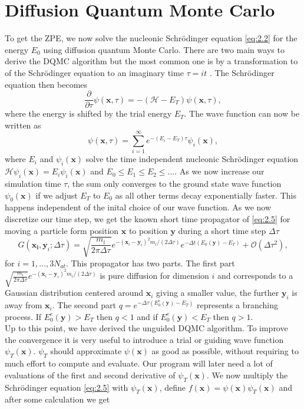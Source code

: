 \documentclass [12pt]{report}
\begin{document}
\section{Diffusion Quantum Monte Carlo}
To get the ZPE, we now solve the nucleonic Schrödinger equation \eqref{eq:2.2} for the energy $E_0$ using diffusion quantum Monte Carlo. There are two main ways to derive the DQMC algorithm but the most common one is by a transformation to of the Schrödinger equation to an imaginary time $\tau = it$ \cite{mccoy,cyrus,herleitung2}. The Schrödinger equation then becomes
\begin{equation} \label{eq:2.5}
\frac{\partial}{\partial \tau} \psi(\bm{x},\tau) = -(\mathcal{H} - E_T) \psi(\bm{x},\tau),
\end{equation}
where the energy is shifted by the trial energy $E_T$. The wave function can now be written as
\begin{equation} \label{eq:2.6}
\psi(\bm{x},\tau) = \sum_{i=1}^{\infty} e^{-(E_i - E_T)\tau}\psi_i(\bm{x}),
\end{equation}
where $E_i$ and $\psi_i(\bm{x})$ solve the time independent nucleonic Schrödinger equation $\mathcal{H}\psi_i(\bm{x}) = E_i \psi_i(\bm{x})$ and $E_0 \leq E_1 \leq E_2 \leq...$.
As we now increase our simulation time $\tau$, the sum only converges to the ground state wave function $\psi_0(\bm{x})$ if we adjust $E_T$ to $E_0$ as all other terms decay exponentially faster. This happens independent of the inital choice of our wave function.
As we now discretize our time step, we get the known short time propagator of \eqref{eq:2.5} for moving a particle form position $\bm{x}$ to position $\bm{y}$ during a short time step $\Delta \tau$
\begin{equation} \label{eq:2.7}
G(\bm{x_i},\bm{y}_i;\Delta \tau) = \sqrt{\frac{m_i}{2 \pi \Delta \tau}} e^{-(\bm{x}_i-\bm{y}_i)^2 m_i/(2 \Delta \tau)} e^{-\Delta t (E_0(\bm{y}) - E_T)} + \mathcal{O}(\Delta \tau^2),
\end{equation}
for $i=1,...,3N_{at}$. This propagator has two parts. The first part $\sqrt{\frac{m_i}{2 \pi \Delta \tau}} e^{-(\bm{x}_i-\bm{y}_i)^2 m_i/(2\Delta \tau)}$ is pure diffusion for dimension $i$ and corresponds to a Gaussian distribution centered around $\bm{x}_i$ giving a smaller value, the further $\bm{y}_i$ is away from $\bm{x}_i$. The second part $q = e^{-\Delta \tau (E_0^e(\bm{y}) - E_T)}$ represents a branching process. If $E_0^e(\bm{y}) > E_T$ then $q < 1$ and if $E_0^e(\bm{y}) < E_T$ then $q > 1$.\\
Up to this point, we have derived the unguided DQMC algorithm. To improve the convergence it is very useful to introduce a trial or guiding wave function $\psi_T(\bm{x})$. $\psi_T$ should approximate $\psi(\bm{x})$ as good as possible, without requiring to much effort to compute and evaluate. Our program will later need a lot of evaluations of the first and second derivative of $\psi_T(\bm{x})$. We now multiply the Schrödinger equation \eqref{eq:2.5} with $\psi_T(\bm{x})$, define $f(\bm{x}) = \psi(\bm{x}) \psi_T(\bm{x})$ and after some calculation \cite{cyrus2} we get
\end{document}
